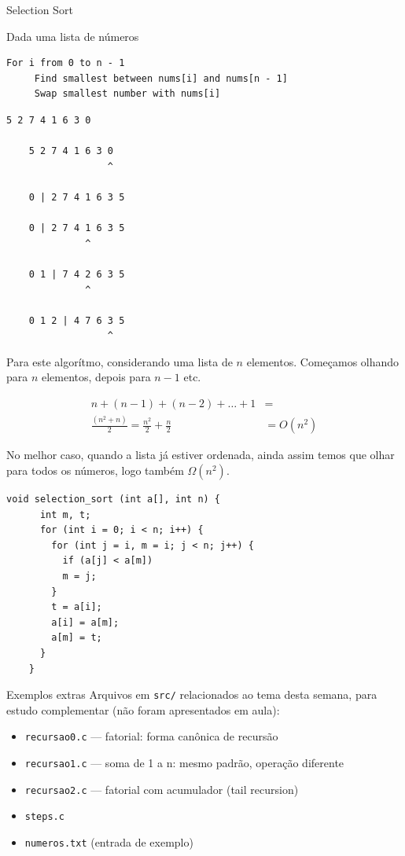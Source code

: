 \documentclass{beamer}
\begin{document}
\begin{frame}{Selection Sort}

  Dada uma lista de números

  \begin{lstlisting}[style=code,basicstyle=\ttfamily\scriptsize]
    For i from 0 to n - 1
     Find smallest between nums[i] and nums[n - 1]
     Swap smallest number with nums[i]
  \end{lstlisting}

  \framebreak

  \begin{lstlisting}[style=code]
    5 2 7 4 1 6 3 0

    5 2 7 4 1 6 3 0
                  ^

    0 | 2 7 4 1 6 3 5
    
    0 | 2 7 4 1 6 3 5
              ^    

    0 1 | 7 4 2 6 3 5
              ^
	  
    0 1 2 | 4 7 6 3 5
                  ^
  \end{lstlisting}

  \framebreak

  Para este algorítmo, considerando uma lista de $n$
  elementos. Começamos olhando para $n$ elementos, depois para $n - 1$
  etc.

  \begin{align*}
    n + (n - 1) + (n - 2) + \ldots + 1 & = \\
    \frac{(n^2 + n)}{2} = \frac{n^2}{2} + \frac{n}{2} & = O(n^2) 
  \end{align*}

  No melhor caso, quando a lista já estiver ordenada, ainda assim
  temos que olhar para todos os números, logo também $\Omega(n^2)$.
  
  \framebreak

  \begin{lstlisting}[style=normalc,caption=selection.c]
    void selection_sort (int a[], int n) {
      int m, t;
      for (int i = 0; i < n; i++) {
        for (int j = i, m = i; j < n; j++) {
          if (a[j] < a[m])
          m = j;
        }
        t = a[i];
        a[i] = a[m];
        a[m] = t;
      }
    }
  \end{lstlisting}

\end{frame}


\begin{frame}{Exemplos extras}
  Arquivos em \texttt{src/} relacionados ao tema desta semana, para
  estudo complementar (não foram apresentados em aula):
  \begin{itemize}
    \item \texttt{recursao0.c} — fatorial: forma canônica de recursão
    \item \texttt{recursao1.c} — soma de 1 a n: mesmo padrão, operação diferente
    \item \texttt{recursao2.c} — fatorial com acumulador (tail recursion)
    \item \texttt{steps.c}
    \item \texttt{numeros.txt} (entrada de exemplo)
  \end{itemize}
\end{frame}
\end{document}
